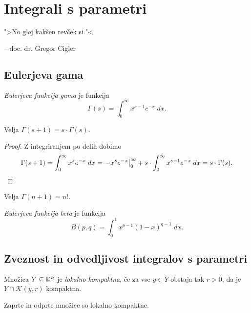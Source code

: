 \section{Integrali s parametri}

\epigraph{">No glej kakšen revček si."<}{-- doc. dr. Gregor Cigler}

\subsection{Eulerjeva gama}


\begin{definicija}
\emph{Eulerjeva funkcija gama} je funkcija
\[
\Gamma(s) = \int_0^\infty x^{s-1} e^{-x}\;dx.
\]
\end{definicija}

\begin{trditev}
Velja $\Gamma(s+1) = s \cdot \Gamma(s)$.
\end{trditev}

\begin{proof}
Z integriranjem po delih dobimo
\[
\Gamma(s+1) =
\int_0^\infty x^s e^{-x}\;dx =
\left. -x^s e^{-x}\right|_{0}^{\infty} +
s \cdot \int_0^\infty x^{s-1} e^{-x}\;dx =
s \cdot \Gamma(s). \qedhere
\]
\end{proof}

\begin{posledica}
Velja $\Gamma(n+1) = n!$.
\end{posledica}

\begin{definicija}
\emph{Eulerjeva funkcija beta} je funkcija
\[
B(p,q) = \int_0^1 x^{p-1}(1-x)^{q-1}\;dx.
\]
\end{definicija}

\newpage

\subsection{Zveznost in odvedljivost integralov s parametri}

\begin{definicija}
Množica $Y \subseteq \mathbb{R}^n$ je
\emph{lokalno kompaktna}, če za
vse $y \in Y$ obstaja tak $r>0$, da je
$Y \cap \overline{\mathcal{K}(y,r)}$ kompaktna.
\end{definicija}

\begin{opomba}
Zaprte in odprte množice so lokalno kompaktne.
\end{opomba}

